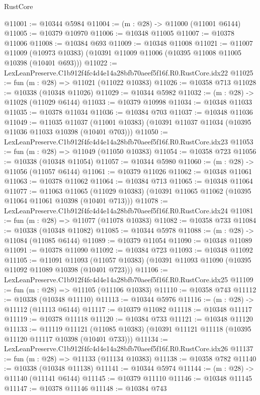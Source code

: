 \begin{lexlean}{RustCore}
\begin{coremodule}
@11001 := @10344 @5984
@11004 := (m : @28) -> @11000 (@11001 @6144)
@11005 := @10379 @10970
@11006 := @10348 @11005
@11007 := @10378 @11006
@11008 := @10384 @693
@11009 := @10348 @11008
@11021 := @11007
    @11009
    (@10973 @10383)
    (@10391 @11009 @11006 (@10395 @11008 @11005 @10398 (@10401 @693)))
@11022 := LexLeanPreserve.C1b912f4fc4d4e14a28bfb70aeef5f16f.R0.RustCore.idx22
@11025 := fun (m : @28) => @11021 (@11022 @10383)
@11026 := @10358 @713
@11028 := @10338 (@10348 @11026)
@11029 := @10344 @5982
@11032 := (m : @28) -> @11028 (@11029 @6144)
@11033 := @10379 @10998
@11034 := @10348 @11033
@11035 := @10378 @11034
@11036 := @10384 @703
@11037 := @10348 @11036
@11049 := @11035
    @11037
    (@11001 @10383)
    (@10391 @11037 @11034 (@10395 @11036 @11033 @10398 (@10401 @703)))
@11050 := LexLeanPreserve.C1b912f4fc4d4e14a28bfb70aeef5f16f.R0.RustCore.idx23
@11053 := fun (m : @28) => @11049 (@11050 @10383)
@11054 := @10358 @723
@11056 := @10338 (@10348 @11054)
@11057 := @10344 @5980
@11060 := (m : @28) -> @11056 (@11057 @6144)
@11061 := @10379 @11026
@11062 := @10348 @11061
@11063 := @10378 @11062
@11064 := @10384 @713
@11065 := @10348 @11064
@11077 := @11063
    @11065
    (@11029 @10383)
    (@10391 @11065 @11062 (@10395 @11064 @11061 @10398 (@10401 @713)))
@11078 := LexLeanPreserve.C1b912f4fc4d4e14a28bfb70aeef5f16f.R0.RustCore.idx24
@11081 := fun (m : @28) => @11077 (@11078 @10383)
@11082 := @10358 @733
@11084 := @10338 (@10348 @11082)
@11085 := @10344 @5978
@11088 := (m : @28) -> @11084 (@11085 @6144)
@11089 := @10379 @11054
@11090 := @10348 @11089
@11091 := @10378 @11090
@11092 := @10384 @723
@11093 := @10348 @11092
@11105 := @11091
    @11093
    (@11057 @10383)
    (@10391 @11093 @11090 (@10395 @11092 @11089 @10398 (@10401 @723)))
@11106 := LexLeanPreserve.C1b912f4fc4d4e14a28bfb70aeef5f16f.R0.RustCore.idx25
@11109 := fun (m : @28) => @11105 (@11106 @10383)
@11110 := @10358 @743
@11112 := @10338 (@10348 @11110)
@11113 := @10344 @5976
@11116 := (m : @28) -> @11112 (@11113 @6144)
@11117 := @10379 @11082
@11118 := @10348 @11117
@11119 := @10378 @11118
@11120 := @10384 @733
@11121 := @10348 @11120
@11133 := @11119
    @11121
    (@11085 @10383)
    (@10391 @11121 @11118 (@10395 @11120 @11117 @10398 (@10401 @733)))
@11134 := LexLeanPreserve.C1b912f4fc4d4e14a28bfb70aeef5f16f.R0.RustCore.idx26
@11137 := fun (m : @28) => @11133 (@11134 @10383)
@11138 := @10358 @782
@11140 := @10338 (@10348 @11138)
@11141 := @10344 @5974
@11144 := (m : @28) -> @11140 (@11141 @6144)
@11145 := @10379 @11110
@11146 := @10348 @11145
@11147 := @10378 @11146
@11148 := @10384 @743

\end{coremodule}
\end{lexlean}
